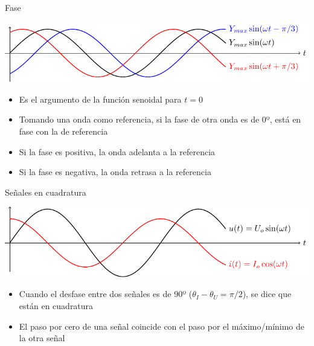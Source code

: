 \documentclass[aspectratio=169, usenames,svgnames,dvipsnames]{beamer}
\begin{document}

\begin{frame}{Fase}
    \begin{center}
        \includegraphics[width=.9\linewidth]{../figs/desfase.pdf}
    \end{center}    

    \begin{itemize}
        \item Es el argumento de la función senoidal para $t=0$        
        \vspace{2mm}
        \item Tomando una onda como referencia, si la \alert{fase de otra onda es de 0º}, está \alert{en fase} con la de referencia        
        \vspace{2mm}
        \item Si la \alert{fase es positiva}, la onda \alert{adelanta} a la referencia   

        \vspace{2mm}
        \item Si la \alert{fase es negativa}, la onda \alert{retrasa} a la referencia
    \end{itemize}
\end{frame}


\begin{frame}{Señales en cuadratura}
    \begin{center}
        \includegraphics[width=.9\linewidth]{../figs/cuadratura.pdf}
    \end{center}
    
    \begin{itemize}
        \item Cuando el \alert{desfase entre dos señales es de 90º} (\(\theta_I - \theta_U = \pi/2\)), se dice que están en \alert{cuadratura}

        \vspace{3mm}
        \item El paso por cero de una señal coincide con el paso por el máximo/mínimo de la otra señal
    \end{itemize}
\end{frame}
\end{document}

